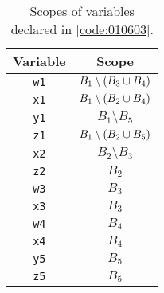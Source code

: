 \begin{table}[!ht]
    \centering
    \begin{tabular}{|c|c|}
        \hline
        \textbf{Variable} & \textbf{Scope} \\
        \hline
        \texttt{w1} & $B_1 \setminus \left( B_3 \cup B_4 \right)$ \\
        \hline
        \texttt{x1} & $B_1 \setminus \left( B_2 \cup B_4 \right)$ \\
        \hline
        \texttt{y1} & $B_1 \setminus B_5$ \\
        \hline
        \texttt{z1} & $B_1 \setminus \left( B_2 \cup B_5 \right)$ \\
        \hline
        \texttt{x2} & $B_2 \setminus B_3$ \\
        \hline
        \texttt{z2} & $B_2$ \\
        \hline
        \texttt{w3} & $B_3$ \\
        \hline
        \texttt{x3} & $B_3$ \\
        \hline
        \texttt{w4} & $B_4$ \\
        \hline
        \texttt{x4} & $B_4$ \\
        \hline
        \texttt{y5} & $B_5$ \\
        \hline
        \texttt{z5} & $B_5$ \\
        \hline
    \end{tabular}
    \caption{Scopes of variables declared in \cref{code:010603}.}
    \label{tab:010603}
\end{table} 